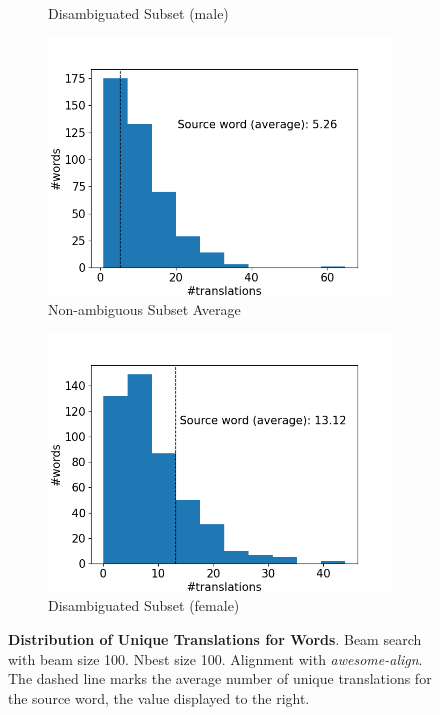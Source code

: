 \begin{figure}[!htb]
\begin{subfigure}{0.49\textwidth}
         \caption{Disambiguated Subset (male)}
     \end{subfigure}
     \begin{subfigure}{0.49\textwidth}
         \centering
         \includegraphics[width=\textwidth]{figures/alignment/align_100/word_translations_average.png}
         \caption{Non-ambiguous Subset Average}
     \end{subfigure}
     \hfill
     \begin{subfigure}{0.49\textwidth}
         \centering
         \includegraphics[width=\textwidth]{figures/alignment/align_100/word_translations_female.png}
         \caption{Disambiguated Subset (female)}
     \end{subfigure}
        \caption{\textbf{Distribution of Unique Translations for Words}. Beam search with beam size 100. Nbest size 100. Alignment with \textit{awesome-align}. The dashed line marks the average number of unique translations for the source word, the value displayed to the right.}
        \label{fig:alignment_graphs_translation_100}

\end{figure}

